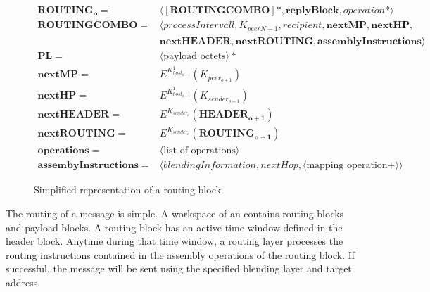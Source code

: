 \begin{figure}[!ht]
	\begin{align}
	\mathbf{ROUTING_o}           = & \langle [ \mathbf{ROUTINGCOMBO} ] *, \mathbf{replyBlock},operation* \rangle\\  
	\mathbf{ROUTINGCOMBO}        = & \langle processIntervall, K_{peerN+1}, recipient, \mathbf{nextMP}, \mathbf{nextHP}, \nonumber \\
	& \mathbf{nextHEADER}, \mathbf{nextROUTING}, \mathbf{assemblyInstructions} \rangle\\
	\mathbf{PL}                  = & \langle \text{payload octets} \rangle *\\ 
	\mathbf{nextMP}              = & E^{K^1_{host_{o+1}}} \left( K_{peer_{o+1}} \right)\\
	\mathbf{nextHP}              = & E^{K^1_{host_{o+1}}} \left( K_{sender_{o+1}} \right)\\
	\mathbf{nextHEADER}          = & E^{K_{sender_o}} \left( \mathbf{HEADER_{o+1}} \right)\\
	\mathbf{nextROUTING}         = & E^{K_{sender_o}} \left( \mathbf{ROUTING_{o+1}} \right)\\    
	\mathbf{operations}          = & \langle \text{list of operations} \rangle \\
	\mathbf{assembyInstructions} = & \langle  blendingInformation, nextHop, \langle \text{mapping operation} +\rangle \rangle
	\end{align}
	\caption{Simplified representation of a routing block}
	\label{fig:mathRoutingSimplified}
\end{figure}

The routing of a message is simple. A workspace of an  contains routing blocks and payload blocks. A routing block has an active time window defined in the header block. Anytime during that time window, a routing layer processes the routing instructions contained in the assembly operations of the routing block. If successful, the message will be sent using the specified blending layer and target address.

